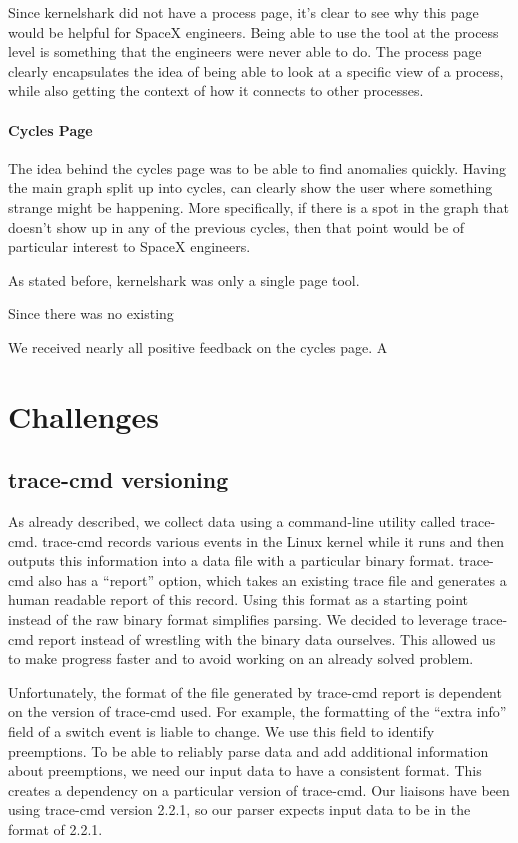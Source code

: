 \documentclass{hmcclinic}
\begin{document}
Since kernelshark did not have a process page, it's clear to see why this page would be helpful for SpaceX engineers. Being able to use the tool at the process level is something that the engineers were never able to do. The process page clearly encapsulates the idea of being able to look at a specific view of a process, while also getting the context of how it connects to other processes.

\subsubsection{Cycles Page}
The idea behind the cycles page was to be able to find anomalies quickly. Having the main graph split up into cycles, can clearly show the user where something strange might be happening. More specifically, if there is a spot in the graph that doesn't show up in any of the previous cycles, then that point would be of particular interest to SpaceX engineers.

As stated before, kernelshark was only a single page tool. 

Since there was no existing 

We received nearly all positive feedback on the cycles page. A


\chapter{Challenges}
\section{trace-cmd versioning} %
  As already described, we collect data using a command-line utility called
  trace-cmd. trace-cmd records various events in the Linux kernel while it runs
  and then outputs this information into a data file with a particular binary
  format. trace-cmd also has a ``report'' option, which takes an existing trace
  file and generates a human readable report of this record. Using this format
  as a starting point instead of the raw binary format simplifies parsing.
  We decided to leverage trace-cmd report instead of wrestling with the binary
  data ourselves. This allowed us to make progress faster and to avoid working
  on an already solved problem.

  Unfortunately, the format of the file generated by trace-cmd report is
  dependent on the version of trace-cmd used. For example, the formatting of the
  ``extra info'' field of a switch event is liable to change. We use this
  field to identify preemptions. To be able to reliably parse data and add
  additional information about preemptions, we need our input data to have
  a consistent format. This creates a dependency on a particular version
  of trace-cmd. Our liaisons have been using trace-cmd version 2.2.1, so
  our parser expects input data to be in the format of 2.2.1.
\end{document}
